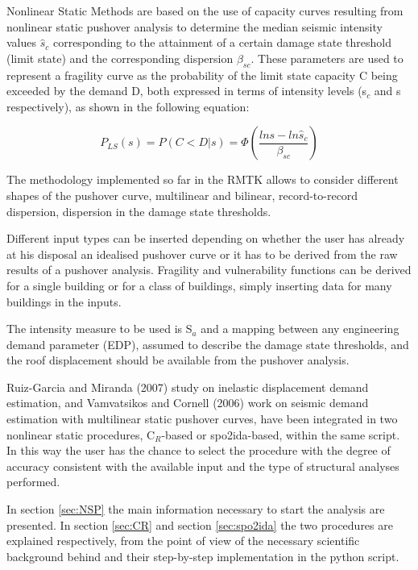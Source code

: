 Nonlinear Static Methods are based on the use of capacity curves resulting from nonlinear static pushover analysis to determine the median seismic intensity values $\hat{s}_c$ corresponding to the attainment of a certain damage state threshold (limit state) and the corresponding dispersion $\beta_{sc}$. These parameters are used to represent a fragility curve as the probability of the limit state capacity C being exceeded by the demand D, both expressed in terms of intensity levels (s$_c$ and s respectively), as shown in the following equation:

\begin{equation}
P_{LS}(s) = P(C < D | s) = \Phi(\frac{ln s -ln \hat{s}_c}{\beta_{sc}})
\label{eq:fragility-definition}
\end{equation}

The methodology implemented so far in the RMTK allows to consider different shapes of the pushover curve, multilinear and bilinear, record-to-record dispersion, dispersion in the damage state thresholds. 

Different input types can be inserted depending on whether the user has already at his disposal an idealised pushover curve or it has to be derived from the raw results of a pushover analysis. Fragility and vulnerability functions can be derived for a single building or for a class of buildings, simply inserting data for many buildings in the inputs.

The intensity measure to be used is S$_a$ and a mapping between any engineering demand parameter (EDP), assumed to describe the damage state thresholds, and the roof displacement should be available from the pushover analysis.

Ruiz-Garcia and Miranda (2007) study on inelastic displacement demand estimation, and Vamvatsikos and Cornell (2006) work on seismic demand estimation with multilinear static pushover curves, have been integrated in two nonlinear static procedures, C$_R$-based or spo2ida-based, within the same script. In this way the user has the chance to select the procedure with the degree of accuracy consistent with the available input and the type of structural analyses performed. 

In section \ref{sec:NSP} the main information necessary to start the analysis are presented. In section \ref{sec:CR} and section \ref{sec:spo2ida} the two procedures are explained respectively, from the point of view of the necessary scientific background behind and their step-by-step implementation in the python script.

